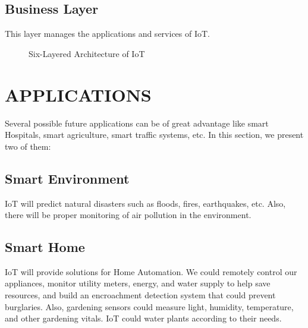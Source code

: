 \documentclass[twoside,twocolumn]{article}
\begin{document}
    \subsection{Business Layer}
        \noindent This layer manages the applications and services of IoT.
    \begin{figure}
        \centering
        \caption{Six-Layered Architecture of IoT}
    \end{figure}

\section{APPLICATIONS}
    \noindent Several possible future applications can be of great advantage like smart Hospitals, smart agriculture, smart traffic systems, etc. In this section, we present two of them:
    \subsection{Smart Environment}
        \noindent IoT will predict natural disasters such as floods, fires, earthquakes, etc. Also, there will be proper monitoring of air pollution in the environment.
    \subsection{Smart Home}
        \noindent IoT will provide solutions for Home Automation. We could remotely control our appliances, monitor utility meters, energy, and water supply to help save resources, and build an encroachment detection system that could prevent burglaries. Also, gardening sensors could measure light, humidity, temperature, and other gardening vitals. IoT could water plants according to their needs.
\end{document}

